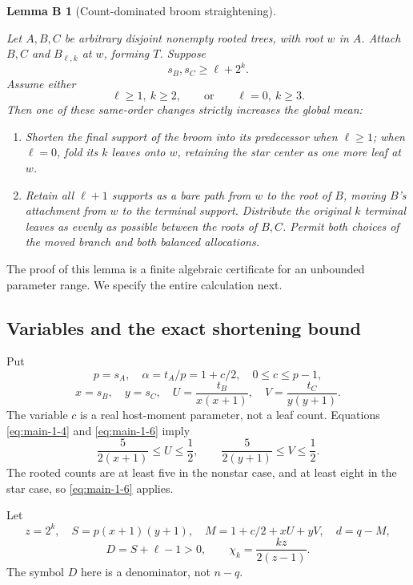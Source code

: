 \documentclass[11pt,reqno]{amsart}
\providecommand{\tightlist}{\setlength{\itemsep}{0.12em}\setlength{\parskip}{0pt}}
\theoremstyle{plain}
\newtheorem*{broomlemma}{Lemma B}
\begin{document}
\begin{broomlemma}[Count-dominated broom straightening]\label{lem:broom}

Let \(A,B,C\) be arbitrary disjoint nonempty rooted trees, with root \(w\) in \(A\). Attach \(B,C\) and \(B_{\ell,k}\) at \(w\), forming \(T\). Suppose \[
s_B,s_C\ge\ell+2^k.
\tag{4.1}\label{eq:main-4-1}
\] Assume either \[
\ell\ge1,\ k\ge2,
\qquad\text{or}\qquad
\ell=0,\ k\ge3.
\] Then one of these same-order changes strictly increases the global mean:

\begin{enumerate}
\def\labelenumi{\arabic{enumi}.}
\tightlist
\item
  Shorten the final support of the broom into its predecessor when \(\ell\ge1\); when \(\ell=0\), fold its \(k\) leaves onto \(w\), retaining the star center as one more leaf at \(w\).
\item
  Retain all \(\ell+1\) supports as a bare path from \(w\) to the root of \(B\), moving \(B\)'s attachment from \(w\) to the terminal support. Distribute the original \(k\) terminal leaves as evenly as possible between the roots of \(B,C\). Permit both choices of the moved branch and both balanced allocations.
\end{enumerate}

\end{broomlemma}

The proof of this lemma is a finite algebraic certificate for an unbounded parameter range. We specify the entire calculation next.

\subsection{Variables and the exact shortening bound}\label{variables-and-the-exact-shortening-bound}

Put \[
p=s_A,\quad \alpha=t_A/p=1+c/2,\quad 0\le c\le p-1,
\] \[
x=s_B,\quad y=s_C,\quad
U=\frac{t_B}{x(x+1)},\quad V=\frac{t_C}{y(y+1)}.
\] The variable \(c\) is a real host-moment parameter, not a leaf count. Equations \eqref{eq:main-1-4} and \eqref{eq:main-1-6} imply \[
\frac5{2(x+1)}\le U\le\frac12,
\qquad
\frac5{2(y+1)}\le V\le\frac12.
\tag{4.2}\label{eq:main-4-2}
\] The rooted counts are at least five in the nonstar case, and at least eight in the star case, so \eqref{eq:main-1-6} applies.

Let \[
z=2^k,\quad S=p(x+1)(y+1),\quad
M=1+c/2+xU+yV,\quad d=q-M,
\] \[
D=S+\ell-1>0,\qquad \chi_k=\frac{kz}{2(z-1)}.
\] The symbol \(D\) here is a denominator, not \(n-q\).
\end{document}
